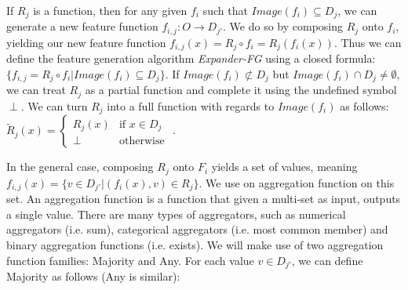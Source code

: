 \documentclass{article}
\theoremstyle{definition}
\begin{document}
If $R_j$ is a function, then for any given $f_i$ such that 
$Image(f_i) \subseteq D_j$, we can generate a new feature function $f_{i,j}:O\rightarrow D_{j'}$. We do so by composing $R_j$ onto $f_i$, yielding our new feature function  $f_{i,j}(x)=R_j\circ f_i=R_j(f_i(x))$.
Thus we can define the feature generation algorithm \emph{Expander-FG} using a closed formula: $\{f_{i,j}=R_j\circ f_i|Image(f_i) \subseteq D_j\}$.
If $Image(f_i) \not\subset D_j$ but $Image(f_i) \cap D_j \neq\emptyset$, we can treat $R_j$ as a partial function and complete it using the undefined symbol $\perp$. We can turn $R_j$ into a full function with regards to $Image(f_i)$ as follows: $\tilde{R}_j(x)=\begin{cases} R_j(x) &\mbox{if } x\in D_j\\ 
\perp & \mbox{otherwise } \end{cases}$.


In the general case, composing $R_j$ onto $F_i$ yields a set of values, meaning $f_{i,j}(x)=\{v\in D_{j'}|(f_i(x),v)\in R_j\}$. 
We use on aggregation function on this set.
An aggregation function is a function that given a multi-set as input, outputs a single value. There are many types of aggregators, such as numerical aggregators (i.e. sum), categorical aggregators (i.e. most common member) and binary aggregation functions (i.e. exists).
We will make use of two aggregation function families: Majority and Any.
For each value $v\in D_{j'}$, we can define Majority as follows (Any is similar):
 
\end{document}
